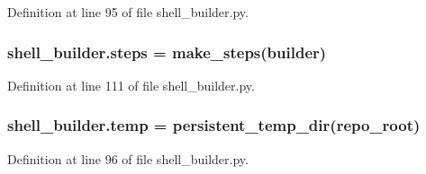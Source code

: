 Definition at line 95 of file shell\+\_\+builder.\+py.

\subsubsection[{steps}]{\setlength{\rightskip}{0pt plus 5cm}shell\+\_\+builder.\+steps = {\bf make\+\_\+steps}({\bf builder})}\label{namespaceshell__builder_a67b3a11bb007088dad28708dd447d5a5}


Definition at line 111 of file shell\+\_\+builder.\+py.

\subsubsection[{temp}]{\setlength{\rightskip}{0pt plus 5cm}shell\+\_\+builder.\+temp = {\bf persistent\+\_\+temp\+\_\+dir}({\bf repo\+\_\+root})}\label{namespaceshell__builder_a0e1d9301974b28caa808de9bf320c64d}


Definition at line 96 of file shell\+\_\+builder.\+py.

